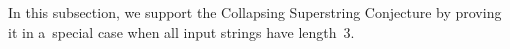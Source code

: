 In this subsection, we support the Collapsing Superstring Conjecture by proving it in a~special case when all input strings have length~3.